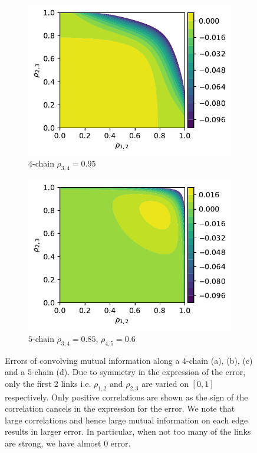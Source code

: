 \documentclass[../Thesis.tex]{subfiles}
\begin{document}
\begin{figure}[H]
\begin{subfigure}[t]{0.49\textwidth}
        \centering
        \includegraphics[width=.95\linewidth]{figures/Gaussian Chain Theoretical/3 chain error - MI - rho3 0_95.pdf}
        \caption{$4$-chain $\rho_{3,4} = 0.95$}
    \end{subfigure}
    \hfill
    \begin{subfigure}[t]{0.49\textwidth}
        \centering
        \includegraphics[width=.95\linewidth]{figures/Gaussian Chain Theoretical/4 chain error - MI - rho3 0_85 rho4 0_6.pdf}
        \caption{$5$-chain $\rho_{3,4} = 0.85$, $\rho_{4,5} = 0.6$}
        \label{subfig:Gaussian 5 chain MI error}
    \end{subfigure}
    \caption{Errors of convolving mutual information along a $4$-chain (a), (b), (c) and a $5$-chain (d). Due to symmetry in the expression of the error, only the first $2$ links i.e. $\rho_{1,2}$ and $\rho_{2,3}$ are varied on $[0,1]$ respectively. Only positive correlations are shown as the sign of the correlation cancels in the expression for the error. We note that large correlations and hence large mutual information on each edge results in larger error. In particular, when not too many of the links are strong, we have almost $0$ error.}
    \label{fig:3 and 4 chain MI error}
\end{figure}
\end{document}
